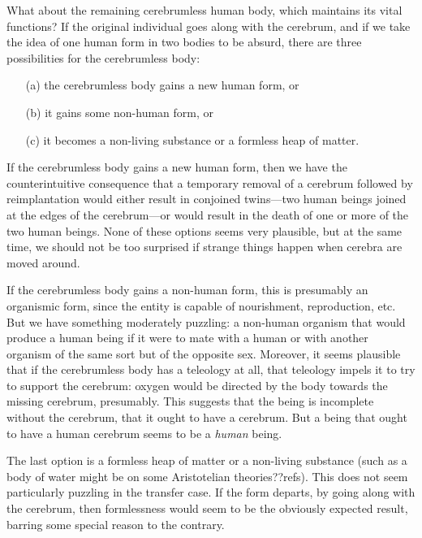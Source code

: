 What about the remaining cerebrumless human body, which maintains its vital functions? If the original individual goes along
with the cerebrum, and if we take the idea of one human form in two bodies to be absurd, there are three possibilities 
for the cerebrumless body:
\begin{itemize}
\item[(a)] the cerebrumless body gains a new human form, or 
\item[(b)] it gains some non-human form, or 
\item[(c)] it becomes a non-living substance or a formless heap of matter. 
\end{itemize}

If the cerebrumless body gains a new human form, then we have the counterintuitive consequence that a temporary removal
of a cerebrum followed by reimplantation would either result in conjoined twins---two human beings joined at the edges
of the cerebrum---or would result in the death of one or more of the two human beings. None of these options seems very
plausible, but at the same time, we should not be too surprised if strange things happen when cerebra are moved around.

If the cerebrumless body gains a non-human form, this is presumably an organismic form, since the entity is capable of
nourishment, reproduction, etc. But we have something moderately puzzling: a non-human organism
that would produce a human being if it were to mate with a human or with another organism of the same sort but of the
opposite sex. Moreover, it seems plausible that if the cerebrumless body has a teleology at all, that teleology impels
it to try to support the cerebrum: oxygen would be directed by the body towards the missing cerebrum, presumably. This
suggests that the being is incomplete without the cerebrum, that it ought to have a cerebrum. But a being that ought 
to have a human cerebrum seems to be a \textit{human} being. 

The last option is a formless heap of matter or a non-living substance (such as a body of water might be on some 
Aristotelian theories??refs). This does not 
seem particularly puzzling in the transfer case. 
If the form departs, by going along with the cerebrum, then formlessness would seem to be the obviously expected result, 
barring some special reason to the contrary.

